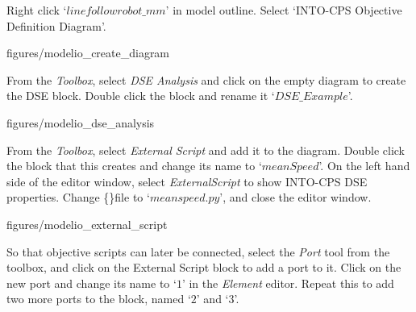 \documentclass[11pt,a4paper]{../tutorial}
\begin{document}
\begin{instructions}
\item Right click `$linefollowrobot\_mm$' in model outline. Select `INTO-CPS \menusep Objective Definition Diagram'.

\begin{center}
\begin{annotation}[width=0.7\linewidth]{figures/modelio_create_diagram}
    \end{annotation}
\end{center}

\newpage

\item From the \emph{Toolbox}, select \emph{DSE Analysis} and click on the empty diagram to create the DSE block.  Double click the block and rename it `$DSE\_Example$'.

\begin{center}
\begin{annotation}[width=0.7\linewidth]{figures/modelio_dse_analysis}
    \end{annotation}
\end{center}

\item \label{start_script_instructions} From the \emph{Toolbox}, select \emph{External Script} and add it to the diagram. Double click the block that this creates and change its name to `$meanSpeed$'. On the left hand side of the editor window, select \emph{ExternalScript} to show INTO-CPS DSE properties. Change \{\}file to `$meanspeed.py$', and close the editor window.

\begin{center}
\begin{annotation}[width=0.7\linewidth]{figures/modelio_external_script}
    \end{annotation}
\end{center}

\item So that objective scripts can later be connected, select the \emph{Port} tool from the toolbox, and click on the External Script block to add a port to it. Click on the new port and change its name to `$1$' in the \emph{Element} editor. Repeat this to add two more ports to the block, named `$2$' and `$3$'.


\end{instructions}
\end{document}
